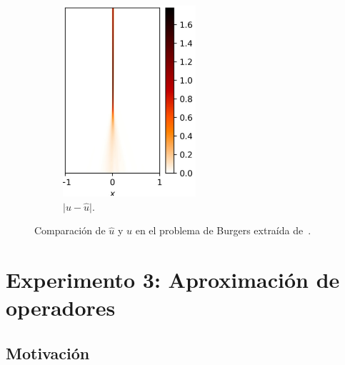 \begin{figure}[htbp]
\begin{subfigure}{0.235\textwidth}
    \includegraphics[width=\linewidth]{img/img88.png}
    \caption{$\vert u- \hat{u}\vert$.}
    \label{fig:img88}
    \end{subfigure}
\caption{Comparación de $\hat{u}$ y $u$  en el problema de Burgers extraída de~\cite{Haghighat2021}.}
\label{fig:img1029}
\end{figure}



\section{Experimento 3: Aproximación de operadores}
\subsection{Motivación}


